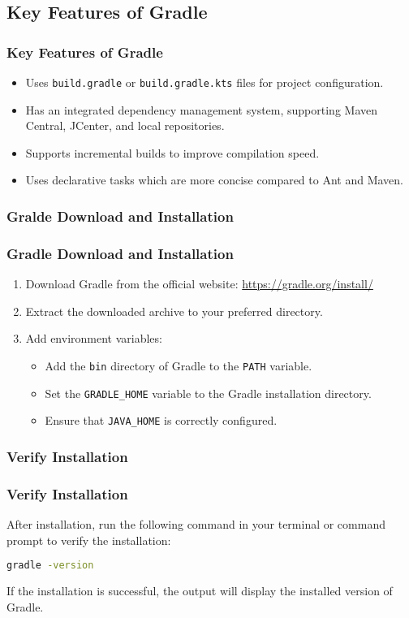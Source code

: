 \documentclass[aspectratio=169, table]{beamer}
\begin{document}
\subsection{Key Features of Gradle}
\begin{frame}[fragile]
	\frametitle{Key Features of Gradle}
	\begin{itemize}
		\item Uses \texttt{build.gradle} or \texttt{build.gradle.kts} files for project configuration.
		\item Has an integrated dependency management system, supporting Maven Central, JCenter, and local repositories.
		\item Supports incremental builds to improve compilation speed.
		\item Uses declarative tasks which are more concise compared to Ant and Maven.
	\end{itemize}
\end{frame}

\subsubsection{Gralde Download and Installation}
\begin{frame}[fragile]
	\frametitle{Gradle Download and Installation}
	\begin{enumerate}
		\item Download Gradle from the official website: \url{https://gradle.org/install/}
		\item Extract the downloaded archive to your preferred directory.
		\item Add environment variables:
		\begin{itemize}
			\item Add the \texttt{bin} directory of Gradle to the \texttt{PATH} variable.
			\item Set the \texttt{GRADLE\_HOME} variable to the Gradle installation directory.
			\item Ensure that \texttt{JAVA\_HOME} is correctly configured.
		\end{itemize}
	\end{enumerate}
\end{frame}

\subsubsection{Verify Installation}
\begin{frame}[fragile]
	\frametitle{Verify Installation}
	After installation, run the following command in your terminal or command prompt to verify the installation:
	\begin{lstlisting}[language=bash]
		gradle -version
	\end{lstlisting}
	If the installation is successful, the output will display the installed version of Gradle.
\end{frame}
\end{document}
